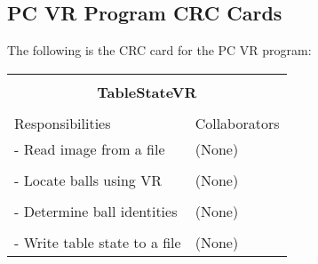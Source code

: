 \documentclass[titlepage]{article}
\begin{document}
\subsection{PC VR Program CRC Cards}
The following is the CRC card for the PC VR program:\\
\begin{table}[!htbp]
\centering
\begin{tabular}{| p{} | p{} |}\hline
	\multicolumn{2}{|l|}{}\\
	\multicolumn{2}{|c|}{\large{\textbf{TableStateVR}}}\\
	\multicolumn{2}{|l|}{}\\\hline
	\vspace{0mm}\large{Responsibilities}\vspace{2mm} &\vspace{0mm}\large{Collaborators}\vspace{2mm}\\\hline
	\vspace{0mm}- Read image from a file		&\vspace{0mm}(None)\\&\\
	- Locate balls using VR						&(None)\\&\\
	- Determine ball identities					&(None)\\&\\
	- Write table state to a file\vspace{2mm}	&(None)\vspace{2mm}\\\hline
\end{tabular}
\end{table}



\pagebreak
\printindex
\end{document}
